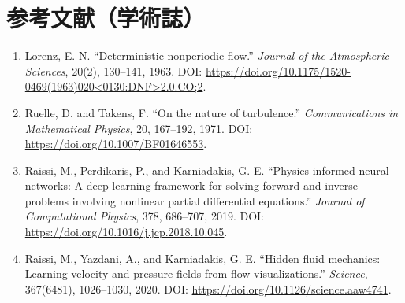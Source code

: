 \section*{参考文献（学術誌）}
\begin{enumerate}[leftmargin=2.4em]
\item Lorenz, E. N. ``Deterministic nonperiodic flow.'' \textit{Journal of the Atmospheric Sciences}, 20(2), 130--141, 1963. DOI: \url{https://doi.org/10.1175/1520-0469(1963)020<0130:DNF>2.0.CO;2}.
\item Ruelle, D. and Takens, F. ``On the nature of turbulence.'' \textit{Communications in Mathematical Physics}, 20, 167--192, 1971. DOI: \url{https://doi.org/10.1007/BF01646553}.
\item Raissi, M., Perdikaris, P., and Karniadakis, G. E. ``Physics-informed neural networks: A deep learning framework for solving forward and inverse problems involving nonlinear partial differential equations.'' \textit{Journal of Computational Physics}, 378, 686--707, 2019. DOI: \url{https://doi.org/10.1016/j.jcp.2018.10.045}.
\item Raissi, M., Yazdani, A., and Karniadakis, G. E. ``Hidden fluid mechanics: Learning velocity and pressure fields from flow visualizations.'' \textit{Science}, 367(6481), 1026--1030, 2020. DOI: \url{https://doi.org/10.1126/science.aaw4741}.
\end{enumerate}
